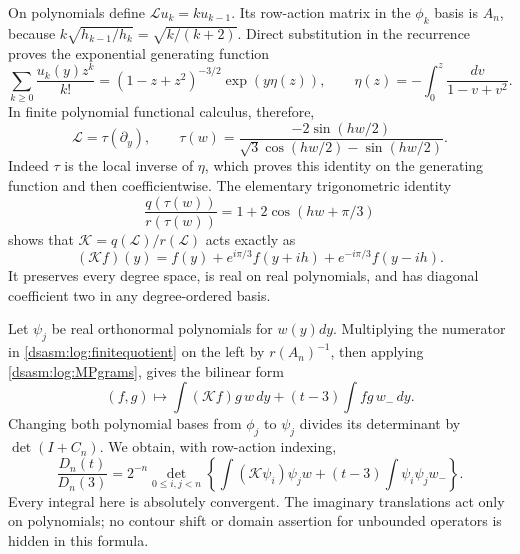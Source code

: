 \documentclass[11pt,letterpaper]{article}
\theoremstyle{remark}\newtheorem{remark}[theorem]{Remark}
\begin{document}
On polynomials define $\mathcal L u_k=ku_{k-1}$. Its row-action
matrix in the $\phi_k$ basis is $A_n$, because
$k\sqrt{h_{k-1}/h_k}=\sqrt{k/(k+2)}$. Direct substitution in the
recurrence proves the exponential generating function
\[
 \sum_{k\ge0}\frac{u_k(y)z^k}{k!}
 =(1-z+z^2)^{-3/2}\exp(y\eta(z)),\qquad
 \eta(z)=-\int_0^z\frac{dv}{1-v+v^2}.
\]
In finite polynomial functional calculus, therefore,
\[
 \mathcal L=\tau(\partial_y),\qquad
 \tau(w)=\frac{-2\sin(hw/2)}{\sqrt3\cos(hw/2)-\sin(hw/2)}.
\]
Indeed $\tau$ is the local inverse of $\eta$, which proves this
identity on the generating function and then coefficientwise.
The elementary trigonometric identity
\[
 \frac{q(\tau(w))}{r(\tau(w))}=1+2\cos(hw+\pi/3)
\]
shows that $\mathcal K=q(\mathcal L)/r(\mathcal L)$ acts exactly as
\begin{equation}\label{dsasm:log:Kaction}
 (\mathcal K f)(y)=f(y)+e^{i\pi/3}f(y+ih)+e^{-i\pi/3}f(y-ih).
\end{equation}
It preserves every degree space, is real on real polynomials, and
has diagonal coefficient two in any degree-ordered basis.

Let $\psi_j$ be real orthonormal polynomials for $w(y)dy$.
Multiplying the numerator in \eqref{dsasm:log:finitequotient} on the left by
$r(A_n)^{-1}$, then applying \eqref{dsasm:log:MPgrams}, gives the bilinear form
\[
 (f,g)\longmapsto\int(\mathcal Kf)g\,w\,dy
                    +(t-3)\int fg\,w_-\,dy.
\]
Changing both polynomial bases from $\phi_j$ to $\psi_j$ divides
its determinant by $\det(I+C_n)$. We obtain, with row-action indexing,
\begin{equation}\label{dsasm:log:WD}
 \frac{D_n(t)}{D_n(3)}=2^{-n}\det_{0\le i,j<n}
 \left\{\int (\mathcal K\psi_i)\psi_jw
                  +(t-3)\int\psi_i\psi_jw_-\right\}.
\end{equation}
Every integral here is absolutely convergent. The imaginary
translations act only on polynomials; no contour shift or domain
assertion for unbounded operators is hidden in this formula.
\end{document}
